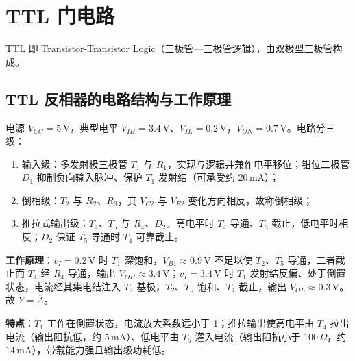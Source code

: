 \section{TTL 门电路}
TTL 即 Transistor-Transistor Logic（三极管—三极管逻辑），由双极型三极管构成。

\subsection{TTL 反相器的电路结构与工作原理}
电源 \(V_{CC}=5\,\mathrm{V}\)，典型电平 \(V_{IH}=3.4\,\mathrm{V}\)、\(V_{IL}=0.2\,\mathrm{V}\)，\(V_{ON}=0.7\,\mathrm{V}\)。电路分三级：
\begin{enumerate}
    \item 输入级：多发射极三极管 \(T_1\) 与 \(R_1\)，实现与逻辑并兼作电平移位；钳位二极管 \(D_1\) 抑制负向输入脉冲、保护 \(T_1\) 发射结（可承受约 \(20\,\mathrm{mA}\)）；
    \item 倒相级：\(T_2\) 与 \(R_2\)、\(R_3\)，其 \(V_{C2}\) 与 \(V_{E2}\) 变化方向相反，故称倒相级；
    \item 推拉式输出级：\(T_4\)、\(T_5\) 与 \(R_4\)、\(D_2\)。高电平时 \(T_4\) 导通、\(T_5\) 截止，低电平时相反；\(D_2\) 保证 \(T_5\) 导通时 \(T_4\) 可靠截止。
\end{enumerate}

\textbf{工作原理}：\(v_I=0.2\,\mathrm{V}\) 时 \(T_1\) 深饱和，\(V_{B1}\approx0.9\,\mathrm{V}\) 不足以使 \(T_2\)、\(T_5\) 导通，二者截止而 \(T_4\) 经 \(R_4\) 导通，输出 \(V_{OH}\approx3.4\,\mathrm{V}\)；\(v_I=3.4\,\mathrm{V}\) 时 \(T_1\) 发射结反偏、处于倒置状态，电流经其集电结注入 \(T_2\) 基极，\(T_2\)、\(T_5\) 饱和、\(T_4\) 截止，输出 \(V_{OL}\approx0.3\,\mathrm{V}\)。故 \(Y=\overline{A}\)。

\textbf{特点}：\(T_1\) 工作在倒置状态，电流放大系数远小于 1；推拉输出使高电平由 \(T_4\) 拉出电流（输出阻抗低，约 \(5\,\mathrm{mA}\)）、低电平由 \(T_5\) 灌入电流（输出阻抗小于 \(100\,\Omega\)，约 \(14\,\mathrm{mA}\)），带载能力强且输出级功耗低。

